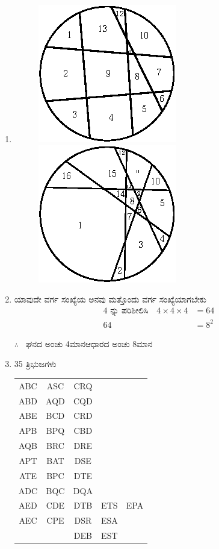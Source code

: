 \begin{enumerate}
\item 
\begin{figure}[H]
\centering
\includegraphics{images/chap4/ans23a.eps}
\includegraphics{images/chap4/ans23b.eps}
\end{figure}

\item ಯಾವುದೇ ವರ್ಗ ಸಂಖ್ಯೆಯ ಅನವು ಮತ್ತೊಂದು ವರ್ಗ ಸಂಖ್ಯೆಯಾಗಬೇಕು 
\begin{align*}
4\text{ ನ್ನು ಪರಿಶೀಲಿಸಿ} \quad 4\times4\times4 & = 64\\
64 &= 8^{2}
\end{align*}

$\therefore$~ ಘನದ ಅಂಚು 4ಮಾನ\quad ಆಧಾರದ ಅಂಚು 8ಮಾನ

\item 35 ತ್ರಿಭುಜಗಳು

\begin{tabular}[t]{ccccc}
ABC & ASC & CRQ & & \\
ABD & AQD & CQD & &\\
ABE & BCD & CRD & &\\
APB & BPQ & CBD & &\\
AQB & BRC & DRE & &\\
APT & BAT & DSE & &\\
ATE & BPC & DTE & &\\
ADC & BQC & DQA & &\\
AED & CDE & DTB & ETS  & EPA\\
AEC & CPE & DSR & ESA  &\\
& & DEB & EST  &\\
\end{tabular}


\end{enumerate}
